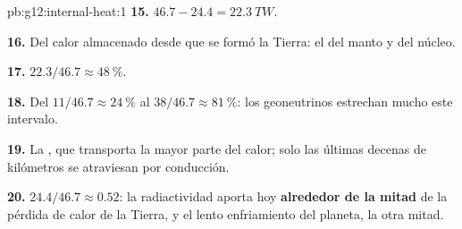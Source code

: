 \begin{solution}{pb:g12:internal-heat:1}
\textbf{15.} $46.7 - 24.4 = \qty{22.3}{TW}$.

\textbf{16.} Del calor almacenado desde que se formó la Tierra: el
 del manto y del núcleo.

\textbf{17.} $22.3/46.7 \approx \qty{48}{\percent}$.

\textbf{18.} Del $11/46.7 \approx \qty{24}{\percent}$ al $38/46.7 \approx
\qty{81}{\percent}$: los geoneutrinos estrechan mucho este intervalo.

\textbf{19.} La , que transporta la mayor parte del calor;
solo las últimas decenas de kilómetros se atraviesan por conducción.

\textbf{20.} $24.4/46.7 \approx 0.52$: la radiactividad aporta hoy
\textbf{alrededor de la mitad} de la pérdida de calor de la Tierra, y el lento
enfriamiento del planeta, la otra mitad.
\end{solution}
